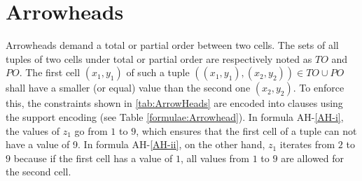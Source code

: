 \clearpage

\section{Arrowheads}\label{Encoding:Arrowheads}
Arrowheads demand a total or partial order between two cells. The sets of all tuples of two cells under total or partial order are respectively noted as $TO$ and $PO$. The first cell $(x_1,y_1)$ of such a tuple  $((x_1,y_1), (x_2,y_2)) \in TO \cup PO$ shall have a smaller (or equal) value than the second one $(x_2,y_2)$. To enforce this, the constraints shown in \ref{tab:ArrowHeads} are encoded into clauses using the support encoding (see Table \ref{formulae:Arrowhead}). In formula AH-\ref{AH-i}, the values of $z_1$ go from $1$ to $9$, which ensures that the first cell of a tuple can not have a value of 9. In formula AH-\ref{AH-ii}, on the other hand, $z_1$ iterates from $2$ to $9$ because if the first cell has a value of $1$, all values from $1$ to $9$ are allowed for the second cell.\\

